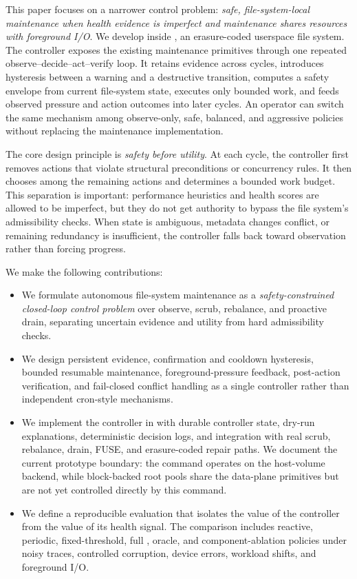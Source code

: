 This paper focuses on a narrower control problem: \emph{safe, file-system-local maintenance when health evidence is imperfect and maintenance shares resources with foreground I/O}. We develop \autopilot{} inside \argosfs{}, an erasure-coded userspace file system. The controller exposes the existing maintenance primitives through one repeated observe--decide--act--verify loop. It retains evidence across cycles, introduces hysteresis between a warning and a destructive transition, computes a safety envelope from current file-system state, executes only bounded work, and feeds observed pressure and action outcomes into later cycles. An operator can switch the same mechanism among observe-only, safe, balanced, and aggressive policies without replacing the maintenance implementation.

The core design principle is \emph{safety before utility}. At each cycle, the controller first removes actions that violate structural preconditions or concurrency rules. It then chooses among the remaining actions and determines a bounded work budget. This separation is important: performance heuristics and health scores are allowed to be imperfect, but they do not get authority to bypass the file system's admissibility checks. When state is ambiguous, metadata changes conflict, or remaining redundancy is insufficient, the controller falls back toward observation rather than forcing progress.

We make the following contributions:
\begin{itemize}[leftmargin=*]
  \item We formulate autonomous file-system maintenance as a \emph{safety-constrained closed-loop control problem} over observe, scrub, rebalance, and proactive drain, separating uncertain evidence and utility from hard admissibility checks.
  \item We design persistent evidence, confirmation and cooldown hysteresis, bounded resumable maintenance, foreground-pressure feedback, post-action verification, and fail-closed conflict handling as a single controller rather than independent cron-style mechanisms.
  \item We implement the controller in \argosfs{} with durable controller state, dry-run explanations, deterministic decision logs, and integration with real scrub, rebalance, drain, FUSE, and erasure-coded repair paths. We document the current prototype boundary: the \autopilot{} command operates on the host-volume backend, while block-backed root pools share the data-plane primitives but are not yet controlled directly by this command.
  \item We define a reproducible evaluation that isolates the value of the controller from the value of its health signal. The comparison includes reactive, periodic, fixed-threshold, full \autopilot{}, oracle, and component-ablation policies under noisy traces, controlled corruption, device errors, workload shifts, and foreground I/O.
\end{itemize}

